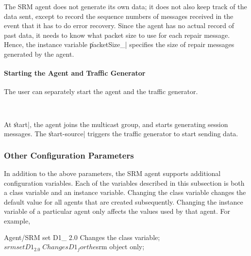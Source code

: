 \documentclass{article}
\begin{document}
The SRM agent does not generate its own data;
it does not also keep track of the data sent,
except to record the sequence numbers of messages received
in the event that it has to do error recovery.
Since the agent has no actual record of past data,
it needs to know what packet size to use for each repair message.
Hence, the instance variable \|packetSize\_| specifies the size
of repair messages generated by the agent.

\paragraph{Starting the Agent and Traffic Generator}
The user can separately start the agent and the traffic generator.
\begin{program}
{\bfseries {}} \\
{\bfseries {}}
\end{program}
At \|start|, the agent joins the multicast group, and 
starts generating session messages.
The \|start-source| triggers the traffic generator to start sending
data.

\subsubsection{Other Configuration Parameters}

In addition to the above parameters,
the SRM agent supports additional configuration variables.
Each of the variables described in this subsection is
both a class variable and an instance variable.
Changing the class variable changes the default value
for all agents that are created subsequently.
Changing the instance variable of a particular agent
only affects the values used by that agent.
For example,
\begin{program}
  \>Agent/SRM set D1_ 2.0     \; Changes the class variable;
  \>$srm set D1_ 2.0          \; Changes D1_ for the $srm object only;
\end{program}
\end{document}
